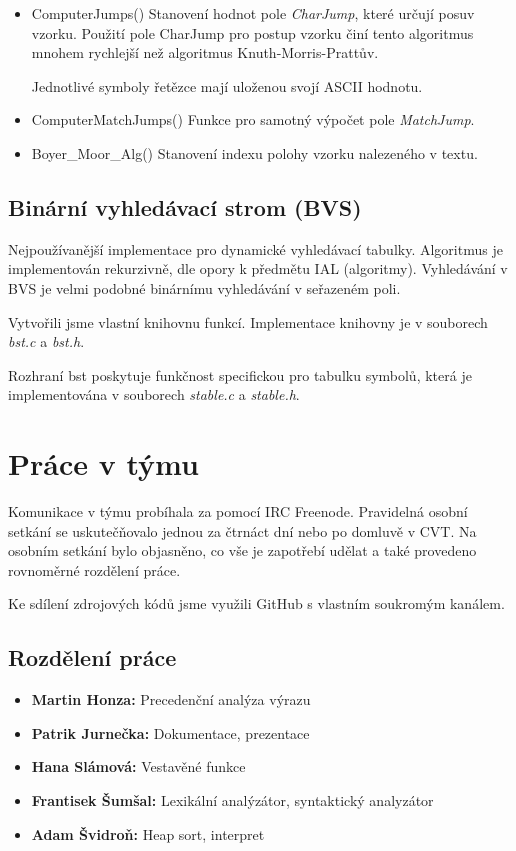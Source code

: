 \documentclass[a4paper, 11pt, titlepage]{article}
\begin{document}
\begin{itemize}
	\item ComputerJumps()
	\subitem Stanovení hodnot pole \textit{CharJump}, které určují posuv vzorku. Použití pole CharJump pro postup vzorku činí tento algoritmus mnohem rychlejší než algoritmus Knuth-Morris-Prattův. 
	
	\subitem Jednotlivé symboly řetězce mají uloženou svojí ASCII hodnotu. 
	
	\item ComputerMatchJumps()
	\subitem Funkce pro samotný výpočet pole \textit{MatchJump}.
	
	\item Boyer\_Moor\_Alg()
	\subitem Stanovení indexu polohy vzorku nalezeného v textu.
	
\end{itemize}

\subsection{Binární vyhledávací strom (BVS)}
Nejpoužívanější implementace pro dynamické vyhledávací tabulky. Algoritmus je implementován rekurzivně, dle opory k předmětu IAL (algoritmy). Vyhledávání v BVS je velmi podobné binárnímu vyhledávání v seřazeném poli.  

Vytvořili jsme vlastní knihovnu funkcí. Implementace knihovny je v souborech \textit{bst.c} a \textit{bst.h}. 

Rozhraní bst poskytuje funkčnost specifickou pro tabulku symbolů, která je implementována v souborech \textit{stable.c} a \textit{stable.h}.

\newpage

\section{Práce v týmu}
Komunikace v týmu probíhala za pomocí IRC Freenode. Pravidelná osobní setkání se uskutečňovalo jednou za čtrnáct dní nebo po domluvě v CVT. Na osobním setkání bylo objasněno, co vše je zapotřebí udělat a také provedeno rovnoměrné rozdělení práce.

Ke sdílení zdrojových kódů jsme využili GitHub s vlastním soukromým kanálem. 

\subsection{Rozdělení práce}

\begin{itemize}
	\item\textbf{Martin Honza:} Precedenční analýza výrazu
	\item\textbf{Patrik Jurnečka:} Dokumentace, prezentace
	\item\textbf{Hana Slámová:} Vestavěné funkce
	\item\textbf{Frantisek Šumšal:} Lexikální analýzátor, syntaktický analyzátor
	\item\textbf{Adam Švidroň:} Heap sort, interpret
\end{itemize}  
\end{document}
